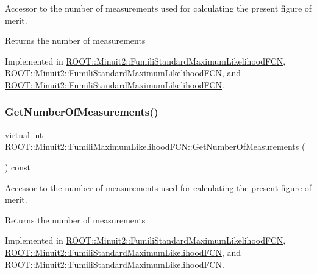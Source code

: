 Accessor to the number of measurements used for calculating the present figure of merit.

\begin{DoxyReturn}{Returns}
the number of measurements 
\end{DoxyReturn}


Implemented in \mbox{\hyperlink{classROOT_1_1Minuit2_1_1FumiliStandardMaximumLikelihoodFCN_a09175207d6c0ed94898f3985b4d376d2}{R\+O\+O\+T\+::\+Minuit2\+::\+Fumili\+Standard\+Maximum\+Likelihood\+F\+CN}}, \mbox{\hyperlink{classROOT_1_1Minuit2_1_1FumiliStandardMaximumLikelihoodFCN_a7c1f879db750fb33c206d3edbbd19ae0}{R\+O\+O\+T\+::\+Minuit2\+::\+Fumili\+Standard\+Maximum\+Likelihood\+F\+CN}}, and \mbox{\hyperlink{classROOT_1_1Minuit2_1_1FumiliStandardMaximumLikelihoodFCN_a7c1f879db750fb33c206d3edbbd19ae0}{R\+O\+O\+T\+::\+Minuit2\+::\+Fumili\+Standard\+Maximum\+Likelihood\+F\+CN}}.

\mbox{\label{classROOT_1_1Minuit2_1_1FumiliMaximumLikelihoodFCN_af0a6b5a302f978363074039c7d55d529}} 
\subsubsection{\texorpdfstring{GetNumberOfMeasurements()}{GetNumberOfMeasurements()}\hspace{0.1cm}{\footnotesize\ttfamily [3/3]}}
{\footnotesize\ttfamily virtual int R\+O\+O\+T\+::\+Minuit2\+::\+Fumili\+Maximum\+Likelihood\+F\+C\+N\+::\+Get\+Number\+Of\+Measurements (\begin{DoxyParamCaption}{ }\end{DoxyParamCaption}) const\hspace{0.3cm}{\ttfamily [pure virtual]}}

Accessor to the number of measurements used for calculating the present figure of merit.

\begin{DoxyReturn}{Returns}
the number of measurements 
\end{DoxyReturn}


Implemented in \mbox{\hyperlink{classROOT_1_1Minuit2_1_1FumiliStandardMaximumLikelihoodFCN_a09175207d6c0ed94898f3985b4d376d2}{R\+O\+O\+T\+::\+Minuit2\+::\+Fumili\+Standard\+Maximum\+Likelihood\+F\+CN}}, \mbox{\hyperlink{classROOT_1_1Minuit2_1_1FumiliStandardMaximumLikelihoodFCN_a7c1f879db750fb33c206d3edbbd19ae0}{R\+O\+O\+T\+::\+Minuit2\+::\+Fumili\+Standard\+Maximum\+Likelihood\+F\+CN}}, and \mbox{\hyperlink{classROOT_1_1Minuit2_1_1FumiliStandardMaximumLikelihoodFCN_a7c1f879db750fb33c206d3edbbd19ae0}{R\+O\+O\+T\+::\+Minuit2\+::\+Fumili\+Standard\+Maximum\+Likelihood\+F\+CN}}.


